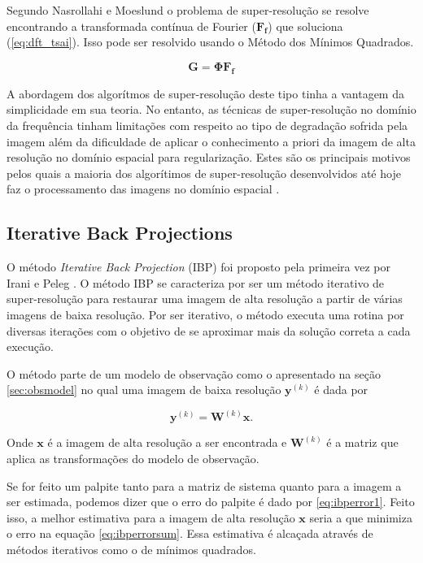 Segundo Nasrollahi e Moeslund \cite{nasrollahi2014super} o problema de super-resolução se resolve encontrando a transformada contínua de Fourier ($\mathbf{F_f}$) que soluciona (\ref{eq:dft_tsai}).
Isso pode ser resolvido usando o Método dos Mínimos Quadrados.

\begin{equation}
	\label{eq:dft_tsai}
	\mathbf{G} = \mathbf{\Phi F_f}
\end{equation}

A abordagem dos algorítmos de super-resolução deste tipo tinha a vantagem da simplicidade em sua teoria.
No entanto, as técnicas de super-resolução no domínio da frequência tinham limitações com respeito ao tipo de degradação sofrida pela imagem além da dificuldade de aplicar o conhecimento a priori da imagem de alta resolução no domínio espacial para regularização.
Estes são os principais motivos pelos quais a maioria dos algorítimos de super-resolução desenvolvidos até hoje faz o processamento das imagens no domínio espacial \cite{park2003super}.

\subsection{Iterative Back Projections}
O método \emph{Iterative Back Projection} (IBP) foi proposto pela primeira vez por Irani e Peleg \cite{irani1991improv}.
O método IBP se caracteriza por ser um método iterativo de super-resolução para restaurar uma imagem de alta resolução a partir de várias imagens de baixa resolução.
Por ser iterativo, o método executa uma rotina por diversas iterações com o objetivo de se aproximar mais da solução correta a cada execução.

O método parte de um modelo de observação como o apresentado na seção \ref{sec:obsmodel} no qual uma imagem de baixa resolução $\mathbf{y}^{(k)}$ é dada por

\begin{equation}
	\mathbf{y}^{(k)} = \mathbf{W}^{(k)} \mathbf{x}.
\end{equation}

Onde $\mathbf{x}$ é a imagem de alta resolução a ser encontrada e $\mathbf{W}^{(k)}$ é a matriz que aplica as transformações do modelo de observação.

Se for feito um palpite tanto para a matriz de sistema quanto para a imagem a ser estimada, podemos dizer que o erro do palpite é dado por \ref{eq:ibperror1}.
Feito isso, a melhor estimativa para a imagem de alta resolução $\mathbf{x}$ seria a que minimiza o erro na equação \ref{eq:ibperrorsum}.
Essa estimativa é alcaçada através de métodos iterativos como o de mínimos quadrados.

